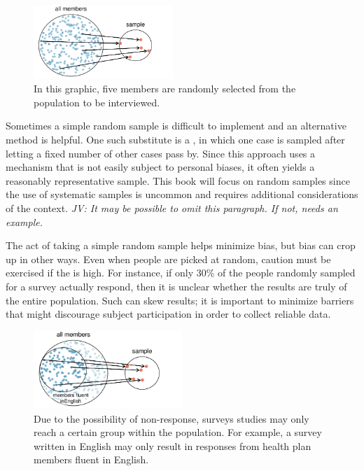 \begin{doublespace}
\begin{figure}[ht]
	\centering
	\includegraphics[width=0.47\textwidth]{ch_intro_to_data_oi_biostat/figures/sampleHealthPlan/sampleHealthPlan}
	\caption{In this graphic, five members are randomly selected from the population to be interviewed.}
	\label{sampleHealthPlan}
\end{figure}

Sometimes a simple random sample is difficult to implement and an alternative method is helpful. One such substitute is a , in which one case is sampled after letting a fixed number of other cases pass by. Since this approach uses a mechanism that is not easily subject to personal biases, it often yields a reasonably representative sample. This book will focus on random samples since the use of systematic samples is uncommon and requires additional considerations of the context. \textit{JV: It may be possible to omit this paragraph. If not, needs an example.}

The act of taking a simple random sample helps minimize bias, but bias can crop up in other ways. Even when people are picked at random, caution must be exercised if the   is high. For instance, if only 30\% of the people randomly sampled for a survey actually respond, then it is unclear whether the results are truly  of the entire population. Such   can skew results; it is important to minimize barriers that might discourage subject participation in order to collect reliable data.

\begin{figure}[h]
	\centering
	\includegraphics[width=0.5\textwidth]{ch_intro_to_data_oi_biostat/figures/sampleHealthPlan/sampleNonResponseHealthPlan}
	\caption{Due to the possibility of non-response, surveys studies may only reach a certain group within the population. For example, a survey written in English may only result in responses from health plan members fluent in English.}
	\label{sampleNonResponseHealthPlan}
\end{figure}



\end{doublespace}
